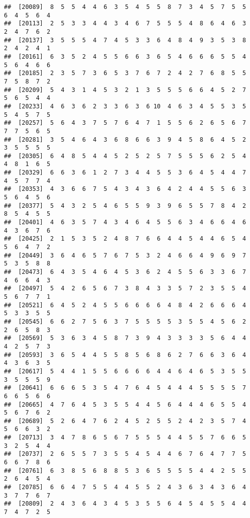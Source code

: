 \documentclass[
]{book}
\begin{document}
\begin{verbatim}
##  [20089]  8  5  5  4  4  6  3  5  4  5  5  8  7  3  4  5  7  5  5  6  4  5  6  4
##  [20113]  2  5  3  3  4  4  3  4  6  7  5  5  5  4  8  6  4  6  3  2  4  7  6  2
##  [20137]  3  5  5  5  4  7  4  5  3  3  6  4  8  4  9  3  5  3  8  2  4  2  4  1
##  [20161]  6  3  5  2  4  5  5  6  6  3  6  5  4  6  6  6  5  5  4  5  6  4  6  6
##  [20185]  2  3  5  7  3  6  5  3  7  6  7  2  4  2  7  6  8  5  5  7  5  8  7  2
##  [20209]  5  4  3  1  4  5  3  2  1  3  5  5  5  6  6  4  5  2  7  5  6  5  4  4
##  [20233]  4  6  3  6  2  3  3  6  3  6 10  4  6  3  4  5  5  3  5  5  4  5  7  5
##  [20257]  5  6  4  3  7  5  7  6  4  7  1  5  5  6  2  6  5  6  7  7  7  5  6  5
##  [20281]  3  5  4  6  4  3  6  8  6  6  3  9  4  5  8  6  4  5  2  3  5  5  5  5
##  [20305]  6  4  8  5  4  4  5  2  5  2  5  7  5  5  5  6  2  5  4  4  8  1  6  5
##  [20329]  6  6  3  6  1  2  7  3  4  4  5  5  3  6  4  5  4  4  7  4  5  7  7  4
##  [20353]  4  3  6  6  7  5  4  3  4  3  6  4  2  4  4  5  5  6  3  5  6  4  5  6
##  [20377]  5  4  3  2  5  4  6  5  5  9  3  9  6  5  5  7  8  4  2  8  5  4  5  5
##  [20401]  4  6  3  5  7  4  3  4  6  4  5  5  6  3  4  6  6  4  6  4  3  6  7  6
##  [20425]  2  1  5  3  5  2  4  8  7  6  6  4  4  5  4  4  6  5  4  5  6  4  7  2
##  [20449]  3  6  4  6  5  7  6  7  5  3  2  4  6  6  4  9  6  9  7  5  3  5  8  8
##  [20473]  6  4  3  5  4  6  4  5  3  6  2  4  5  5  6  3  3  6  7  4  6  6  4  3
##  [20497]  5  4  2  6  5  6  7  3  8  4  3  3  5  7  2  3  5  5  4  5  6  7  7  1
##  [20521]  6  4  5  2  4  5  5  6  6  6  6  4  8  4  2  6  6  6  4  5  3  3  5  5
##  [20545]  6  6  2  7  5  6  3  7  5  5  5  5  3  5  5  4  5  6  2  2  6  5  8  3
##  [20569]  5  3  6  3  4  5  8  7  3  9  4  3  3  3  3  5  6  4  4  4  2  5  7  3
##  [20593]  3  6  5  4  4  5  5  8  5  6  8  6  2  7  6  6  3  6  4  4  3  6  3  5
##  [20617]  5  4  4  1  5  5  6  6  6  6  4  4  6  4  6  5  3  5  5  3  5  5  5  9
##  [20641]  6  6  6  5  3  5  4  7  6  4  5  4  4  4  5  5  5  5  7  6  6  5  6  6
##  [20665]  4  7  6  4  5  3  5  5  4  4  5  6  4  4  4  6  5  5  4  5  6  7  6  2
##  [20689]  5  2  6  4  7  6  2  4  5  2  5  5  2  4  2  3  5  7  4  5  6  6  3  2
##  [20713]  3  4  7  8  6  5  6  7  5  5  5  4  4  5  5  7  6  6  5  3  2  5  4  4
##  [20737]  2  6  5  5  7  3  5  5  4  5  4  4  6  7  6  4  7  7  5  6  6  7  8  6
##  [20761]  6  3  8  5  6  8  8  5  3  6  5  5  5  5  4  4  2  5  5  2  6  4  5  4
##  [20785]  6  6  4  7  5  5  4  4  5  5  2  4  3  6  3  4  3  6  4  3  7  7  6  7
##  [20809]  2  4  3  6  4  3  4  5  3  5  5  6  4  5  4  5  5  4  4  7  4  7  2  5

\end{verbatim}
\end{document}
